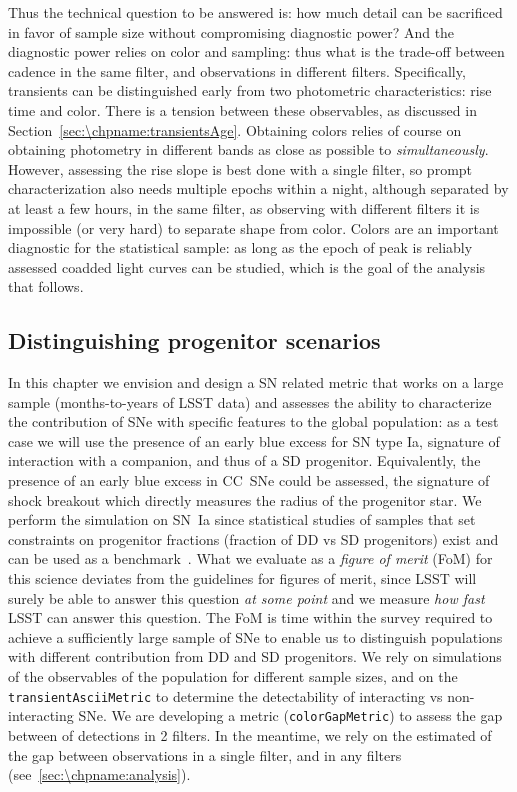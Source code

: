 Thus the technical question to be answered is: how much detail can be
sacrificed in favor of sample size without compromising diagnostic
power? And the diagnostic power relies on color and sampling: thus
what is the trade-off between cadence in the same filter, and
observations in different filters. Specifically, transients can be
distinguished early from two photometric characteristics: rise time
and color. There is a tension between these observables, as discussed
in Section~\ref{sec:\chpname:transientsAge}. Obtaining colors relies
of course on obtaining photometry in different bands as close as
possible to \emph{simultaneously}.  However, assessing the rise slope
is best done with a single filter, so prompt characterization also
needs multiple epochs within a night, although separated by at least a
few hours, in the same filter, as observing with different
filters it is impossible (or very hard) to separate shape from
color. Colors are an important diagnostic for the
statistical sample: as long as the epoch of peak is reliably assessed
coadded light curves can be studied, which is the goal of the analysis
that follows.

\subsection{Distinguishing progenitor scenarios}

In this chapter we envision and design a SN related metric that works
on a large sample (months-to-years of LSST data) and assesses the
ability to characterize the contribution of SNe with specific features
to the global population: as a test case we will use the presence of
an early blue excess for SN type Ia, signature of interaction with a
companion, and thus of a SD progenitor. Equivalently, the presence of
an early blue excess in CC~SNe could be assessed, the signature of
shock breakout which directly measures the radius of the progenitor
star. We perform the simulation on SN~Ia since statistical studies of
samples that set constraints on progenitor fractions (fraction of DD
vs SD progenitors) exist and can be used as a
benchmark~\citep{Hayden2010, Bianco11}.  What we evaluate as a
\emph{figure of merit} (FoM) for this science deviates from the
guidelines for figures of merit, since LSST will surely be able to
answer this question \emph{at some point} and we measure \emph{how
  fast} LSST can answer this question. The FoM is time
within the survey required to achieve a sufficiently large sample of
SNe to enable us to distinguish
populations with different contribution from DD and SD progenitors.
We rely on simulations of the observables of the population for
different sample sizes, and on the \texttt{transientAsciiMetric} to
determine the detectability of interacting vs non-interacting
SNe. We are developing a metric (\texttt{colorGapMetric}) to assess
the gap between of detections in 2 filters. In the meantime, we rely on
the estimated of the gap between observations in a single filter, and
in any filters (see~\autoref{sec:\chpname:analysis}).

